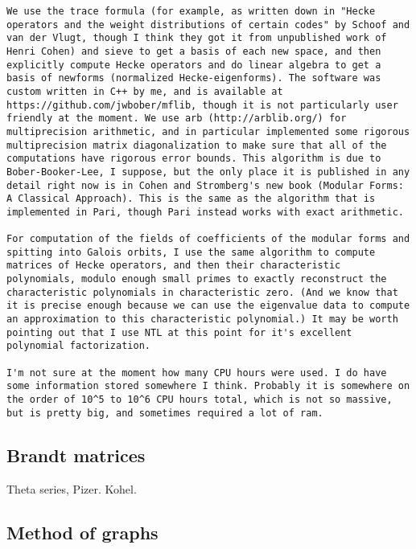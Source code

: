 \documentclass[11pt]{amsart}
\numberwithin{equation}{subsection}
\theoremstyle{plain}
\theoremstyle{definition}
\begin{document}
\begin{verbatim}
We use the trace formula (for example, as written down in "Hecke operators and the weight distributions of certain codes" by Schoof and van der Vlugt, though I think they got it from unpublished work of Henri Cohen) and sieve to get a basis of each new space, and then explicitly compute Hecke operators and do linear algebra to get a basis of newforms (normalized Hecke-eigenforms). The software was custom written in C++ by me, and is available at https://github.com/jwbober/mflib, though it is not particularly user friendly at the moment. We use arb (http://arblib.org/) for multiprecision arithmetic, and in particular implemented some rigorous multiprecision matrix diagonalization to make sure that all of the computations have rigorous error bounds. This algorithm is due to Bober-Booker-Lee, I suppose, but the only place it is published in any detail right now is in Cohen and Stromberg's new book (Modular Forms: A Classical Approach). This is the same as the algorithm that is implemented in Pari, though Pari instead works with exact arithmetic.

For computation of the fields of coefficients of the modular forms and spitting into Galois orbits, I use the same algorithm to compute matrices of Hecke operators, and then their characteristic polynomials, modulo enough small primes to exactly reconstruct the characteristic polynomials in characteristic zero. (And we know that it is precise enough because we can use the eigenvalue data to compute an approximation to this characteristic polynomial.) It may be worth pointing out that I use NTL at this point for it's excellent polynomial factorization.

I'm not sure at the moment how many CPU hours were used. I do have some information stored somewhere I think. Probably it is somewhere on the order of 10^5 to 10^6 CPU hours total, which is not so massive, but is pretty big, and sometimes required a lot of ram.
\end{verbatim}

\subsection{Brandt matrices}

Theta series, Pizer.  Kohel.  

\subsection{Method of graphs}
\end{document}
